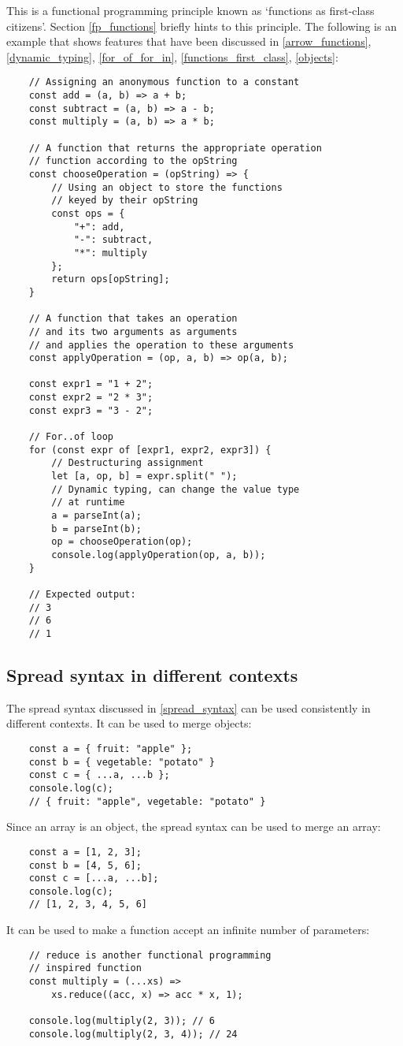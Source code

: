 \documentclass[11pt,a4paper]{article}
\begin{document}
This is a functional programming principle known as `functions as first-class citizens'.
Section \ref{fp_functions} briefly hints to this principle.
The following is an example that shows features that have been discussed in
\ref{arrow_functions}, \ref{dynamic_typing}, \ref{for_of_for_in}, \ref{functions_first_class}, \ref{objects}:
\begin{verbatim}
    // Assigning an anonymous function to a constant
    const add = (a, b) => a + b;
    const subtract = (a, b) => a - b;
    const multiply = (a, b) => a * b;

    // A function that returns the appropriate operation
    // function according to the opString
    const chooseOperation = (opString) => {
        // Using an object to store the functions
        // keyed by their opString
        const ops = {
            "+": add,
            "-": subtract,
            "*": multiply
        };
        return ops[opString];
    }

    // A function that takes an operation
    // and its two arguments as arguments
    // and applies the operation to these arguments
    const applyOperation = (op, a, b) => op(a, b);

    const expr1 = "1 + 2";
    const expr2 = "2 * 3";
    const expr3 = "3 - 2";

    // For..of loop
    for (const expr of [expr1, expr2, expr3]) {
        // Destructuring assignment
        let [a, op, b] = expr.split(" ");
        // Dynamic typing, can change the value type
        // at runtime
        a = parseInt(a);
        b = parseInt(b);
        op = chooseOperation(op);
        console.log(applyOperation(op, a, b));
    }

    // Expected output:
    // 3
    // 6
    // 1
\end{verbatim}

\subsection{Spread syntax in different contexts}
The spread syntax discussed in \ref{spread_syntax} can be used consistently in different contexts.
It can be used to merge objects:
\begin{verbatim}
    const a = { fruit: "apple" };
    const b = { vegetable: "potato" }
    const c = { ...a, ...b };
    console.log(c);
    // { fruit: "apple", vegetable: "potato" }
\end{verbatim}
Since an array is an object, the spread syntax can be used to merge an array:
\begin{verbatim}
    const a = [1, 2, 3];
    const b = [4, 5, 6];
    const c = [...a, ...b];
    console.log(c);
    // [1, 2, 3, 4, 5, 6]
\end{verbatim}
It can be used to make a function accept an infinite number of parameters:
\begin{verbatim}
    // reduce is another functional programming
    // inspired function
    const multiply = (...xs) =>
        xs.reduce((acc, x) => acc * x, 1);

    console.log(multiply(2, 3)); // 6
    console.log(multiply(2, 3, 4)); // 24
\end{verbatim}
\end{document}
